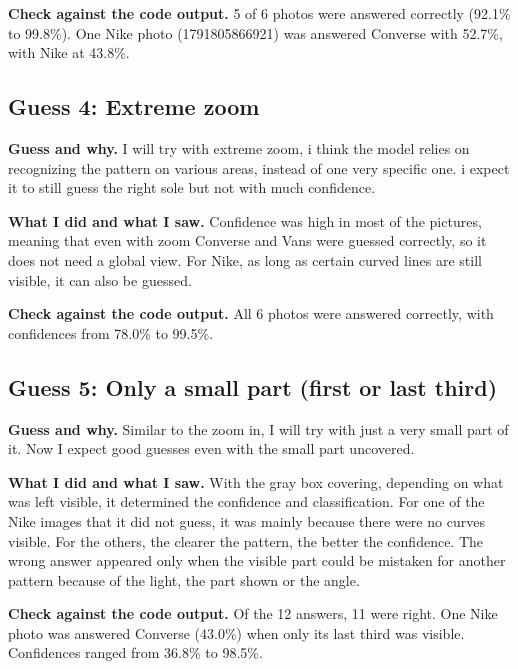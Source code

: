 \documentclass[11pt]{article}
\begin{document}

\textbf{Check against the code output.} 5 of 6 photos were answered correctly (92.1\% to 99.8\%). One Nike photo (1791805866921) was answered Converse with 52.7\%, with Nike at 43.8\%.

\subsection*{Guess 4: Extreme zoom}
\textbf{Guess and why.} I will try with extreme zoom, i think the model relies on recognizing the pattern on various areas, instead of one very specific one. i expect it to still guess the right sole but not with much confidence.

\textbf{What I did and what I saw.} Confidence was high in most of the pictures, meaning that even with zoom Converse and Vans were guessed correctly, so it does not need a global view. For Nike, as long as certain curved lines are still visible, it can also be guessed.


\textbf{Check against the code output.} All 6 photos were answered correctly, with confidences from 78.0\% to 99.5\%.

\subsection*{Guess 5: Only a small part (first or last third)}
\textbf{Guess and why.} Similar to the zoom in, I will try with just a very small part of it. Now I expect good guesses even with the small part uncovered.

\textbf{What I did and what I saw.} With the gray box covering, depending on what was left visible, it determined the confidence and classification. For one of the Nike images that it did not guess, it was mainly because there were no curves visible. For the others, the clearer the pattern, the better the confidence. The wrong answer appeared only when the visible part could be mistaken for another pattern because of the light, the part shown or the angle.



\textbf{Check against the code output.} Of the 12 answers, 11 were right. One Nike photo was answered Converse (43.0\%) when only its last third was visible. Confidences ranged from 36.8\% to 98.5\%.
\end{document}
